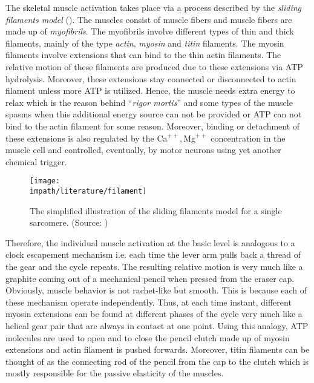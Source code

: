 The skeletal muscle activation takes place via a process described by the \emph{sliding filaments model} (). 
The muscles consist of muscle fibers and muscle fibers are made up of \emph{myofibrils}. The myofibrils involve different types of thin 
and thick filaments, mainly of the type \emph{actin}, \emph{myosin} and \emph{titin} filaments. The myosin filaments involve 
extensions that can bind to the thin actin filaments. The relative motion of these filaments are produced due to these 
extensions via ATP hydrolysis. Moreover, these extensions stay connected or disconnected to actin filament unless more 
ATP is utilized. Hence, the muscle needs extra energy to relax which is the reason behind \enquote{\emph{rigor mortis}} 
and some types of the muscle spasms when this additional energy source can not be provided or ATP can not bind to the 
actin filament for some reason. Moreover, binding or detachment of these extensions is also regulated by the 
$\mathrm{Ca}^{++},\mathrm{Mg}^{++}$ concentration in the muscle cell and controlled, eventually, by motor neurons using yet another 
chemical trigger. 

\begin{figure}%
\centering
\texttt{[image: \\impath/literature/filament]}%
\caption[The simplified illustration of the sliding filaments model for a single sarcomere.]%
{The simplified illustration of the sliding filaments model for a single sarcomere. (Source: \cite{ottenheijm})}%
\label{fig:lit:filament}%
\end{figure}


Therefore, the individual muscle activation at the basic level is analogous to a clock escapement mechanism \cite{headrick} 
i.e. each time the lever arm pulls back a thread of the gear and the cycle repeats. The resulting relative motion is very much 
like a graphite coming out of a mechanical pencil when pressed from the eraser cap. Obviously, muscle behavior is not rachet-like 
but smooth. This is because each of these mechanism operate independently. Thus, at each time instant, different myosin extensions 
can be found at different phases of the cycle very much like a helical gear pair that are always in contact at one point. 
Using this analogy, ATP molecules are used to open and to close the pencil clutch made up of myosin extensions and actin filament 
is pushed forwards. Moreover, titin filaments can be thought of as the connecting rod of the pencil from the cap to the clutch which 
is mostly responsible for the passive elasticity of the muscles. 

